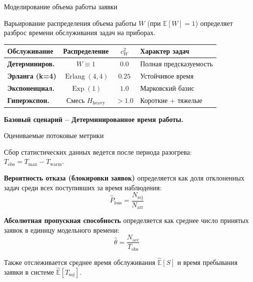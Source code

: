 \documentclass[aspectratio=169,12pt]{beamer}
\newcommand{\slideconclusion}[1]{
  \vspace{0.25cm}
  {\large\bfseries #1}
}
\begin{document}
\begin{frame}{Моделирование объема работы заявки}

Варьирование распределения объема работы $W$ (при $\mathbb{E}[W]=1$) определяет разброс времени обслуживания задач на приборах.

\vspace{0.2cm}
\begin{center}
\small
\renewcommand{\arraystretch}{1.3}
\begin{tabular}{l|c|c|l}
  \textbf{Обслуживание} & \textbf{Распределение} & $c_W^2$ & \textbf{Характер задач} \\ \hline
  \color{rudnblue}\textbf{Детерминиров.} & $W \equiv 1$ & $0.0$ & Полная предсказуемость \\
  \textbf{Эрланга (k=4)} & $\operatorname{Erlang}(4, 4)$ & $0.25$ & Устойчивое время \\
  \textbf{Экспоненциал.} & $\operatorname{Exp}(1)$ & $1.0$ & Марковский базис \\
  \textbf{Гиперэкспон.} & Смесь $H_{\mathrm{heavy}}$ & $> 1.0$ & Короткие + тяжелые \\
\end{tabular}
\end{center}

\vspace{0.3cm}
\flushleft
\slideconclusion{Базовый сценарий -- Детерминированное время работы.}

\end{frame}
\begin{frame}{Оцениваемые потоковые метрики}

Сбор статистических данных ведется после периода разогрева:
$T_{\mathrm{obs}} = T_{\max} - T_{\mathrm{warm}}$.

\vspace{0.4cm}

\textbf{Вероятность отказа (блокировки заявок)} определяется как доля отклоненных задач среди всех поступивших за время наблюдения:
\[
\widehat{P}_{\mathrm{loss}} = \frac{N_{\mathrm{rej}}}{N_{\mathrm{arr}}}
\]


\textbf{Абсолютная пропускная способность}  определяется как среднее число принятых заявок в единицу модельного времени:
\[
\widehat{\theta} = \frac{N_{\mathrm{acc}}}{T_{\mathrm{obs}}}
\]

Также отслеживается среднее время обслуживания $\widehat{\mathbb{E}}[S]$ и время пребывания заявки в системе $\widehat{\mathbb{E}}[T_{\mathrm{soj}}]$.

\end{frame}
\end{document}
